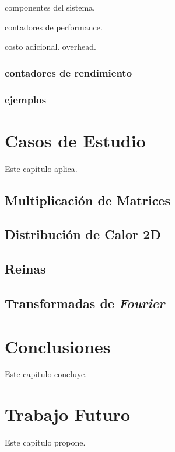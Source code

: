 \documentclass[a4paper]{report}
\begin{document}
componentes del sistema.

contadores de performance.

costo adicional. overhead.

\subsection{contadores de rendimiento}

\subsection{ejemplos}

\chapter{Casos de Estudio}

Este cap\'itulo aplica.

\section{Multiplicaci\'on de Matrices}

\section{Distribuci\'on de Calor 2D}

\section{Reinas}

\section{Transformadas de {\it Fourier}}

\chapter{Conclusiones}

Este capitulo concluye.

\chapter{Trabajo Futuro}

Este capitulo propone.
\end{document}
